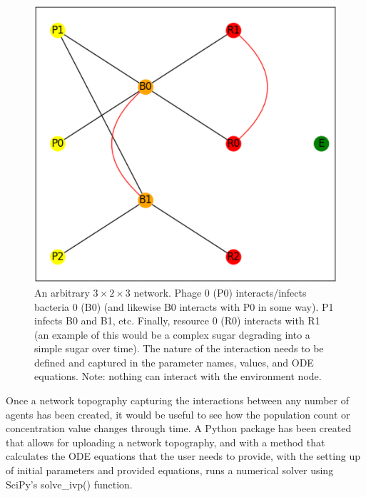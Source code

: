 \begin{figure}
    \centering
    \includegraphics[width=0.5\linewidth]{Screenshots/example_network.png}
    \caption{An arbitrary $3\times2\times3$ network. Phage 0 (P0) interacts/infects bacteria 0 (B0) (and likewise B0 interacts with P0 in some way). P1 infects B0 and B1, etc. Finally, resource 0 (R0) interacts with R1 (an example of this would be a complex sugar degrading into a simple sugar over time). The nature of the interaction needs to be defined and captured in the parameter names, values, and ODE equations. Note: nothing can interact with the environment node.}
    \label{fig:ss:example_network}
\end{figure}
 
Once a network topography capturing the interactions between any number of agents has been created, it would be useful to see how the population count or concentration value changes through time. 
A Python package has been created that allows for uploading a network topography, and with a method that calculates the ODE equations that the user needs to provide, with the setting up of initial parameters and provided equations, runs a numerical solver using SciPy's solve\_ivp() function.  
